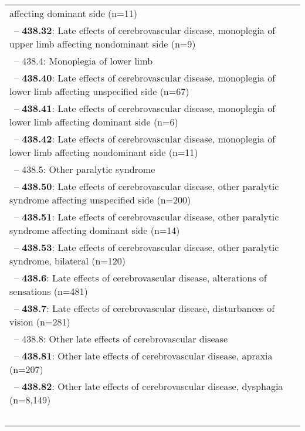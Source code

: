 \begin{longtable}{p{\textwidth}}
affecting dominant side (n=11)} \\ \-\ \hspace{40pt}\footnotesize{-- {\color{ForestGreen} \textbf{438.32}}: Late effects of cerebrovascular disease, monoplegia of upper limb affecting nondominant side (n=9)} \\ \-\ \hspace{30pt}\footnotesize{-- 438.4: Monoplegia of lower limb} \\ \-\ \hspace{40pt}\footnotesize{-- {\color{ForestGreen} \textbf{438.40}}: Late effects of cerebrovascular disease, monoplegia of lower limb affecting unspecified side (n=67)} \\ \-\ \hspace{40pt}\footnotesize{-- {\color{ForestGreen} \textbf{438.41}}: Late effects of cerebrovascular disease, monoplegia of lower limb affecting dominant side (n=6)} \\ \-\ \hspace{40pt}\footnotesize{-- {\color{ForestGreen} \textbf{438.42}}: Late effects of cerebrovascular disease, monoplegia of lower limb affecting nondominant side (n=11)} \\ \-\ \hspace{30pt}\footnotesize{-- 438.5: Other paralytic syndrome} \\ \-\ \hspace{40pt}\footnotesize{-- {\color{ForestGreen} \textbf{438.50}}: Late effects of cerebrovascular disease, other paralytic syndrome affecting unspecified side (n=200)} \\ \-\ \hspace{40pt}\footnotesize{-- {\color{ForestGreen} \textbf{438.51}}: Late effects of cerebrovascular disease, other paralytic syndrome affecting dominant side (n=14)} \\ \-\ \hspace{40pt}\footnotesize{-- {\color{ForestGreen} \textbf{438.53}}: Late effects of cerebrovascular disease, other paralytic syndrome, bilateral (n=120)} \\ \-\ \hspace{30pt}\footnotesize{-- {\color{ForestGreen} \textbf{438.6}}: Late effects of cerebrovascular disease, alterations of sensations (n=481)} \\ \-\ \hspace{30pt}\footnotesize{-- {\color{ForestGreen} \textbf{438.7}}: Late effects of cerebrovascular disease, disturbances of vision (n=281)} \\ \-\ \hspace{30pt}\footnotesize{-- 438.8: Other late effects of cerebrovascular disease} \\ \-\ \hspace{40pt}\footnotesize{-- {\color{ForestGreen} \textbf{438.81}}: Other late effects of cerebrovascular disease, apraxia (n=207)} \\ \-\ \hspace{40pt}\footnotesize{-- {\color{ForestGreen} \textbf{438.82}}: Other late effects of cerebrovascular disease, dysphagia (n=8,149)} \\ \-\ 
\end{longtable}
